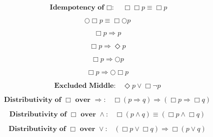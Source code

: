 \documentclass[fleqn, leqno]{article}
\begin{document}
\begin{equation}\label{E:IdemAlways}
\textbf{Idempotency of $\Box$:}\quad \Box\Box p \equiv \Box p
\end{equation}

\begin{equation}\label{E:dNextAlways}
\bigcirc\Box p \equiv \Box\bigcirc p
\end{equation}

\begin{equation}\label{E:ImpAlways}
\Box p \Rightarrow p
\end{equation}

\begin{equation}\label{E:ImpAlwaysE}
\Box p \Rightarrow \Diamond p
\end{equation}

\begin{equation}\label{E:ImpAlwaysN}
\Box p \Rightarrow \bigcirc p
\end{equation}

\begin{equation}\label{E:ImpAlwaysNA}
\Box p \Rightarrow \bigcirc\Box p
\end{equation}

\begin{equation}\label{E:excludedMid}
\textbf{Excluded Middle:}\quad \Diamond p \lor \Box\lnot p
\end{equation}

\begin{equation}\label{E:distAlwaysImp}
\textbf{Distributivity of $\Box$ over $\Rightarrow$:}\quad \Box (p \Rightarrow q) \Rightarrow (\Box p \Rightarrow \Box q)
\end{equation}

\begin{equation}\label{E:distAlwaysAnd}
\textbf{Distributivity of $\Box$ over $\land$:}\quad \Box (p \land q) \equiv (\Box p \land \Box q)
\end{equation}

\begin{equation}\label{E:distAlwaysOr}
\textbf{Distributivity of $\Box$ over $\lor$:}\quad (\Box p \lor \Box q) \Rightarrow \Box (p \lor q)
\end{equation}
\end{document}

